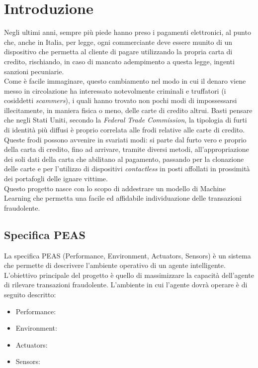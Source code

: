 \documentclass[]{article}
\begin{document}
\section{Introduzione}
    Negli ultimi anni, sempre più piede hanno preso i pagamenti elettronici, al punto che, anche in Italia, per legge, ogni commerciante deve essere munito di un dispositivo che permetta al cliente di pagare utilizzando la propria carta di credito, rischiando, in caso di mancato adempimento a questa legge, ingenti sanzioni pecuniarie.\\
    Come è facile immaginare, questo cambiamento nel modo in cui il denaro viene messo in circolazione ha interessato notevolmente criminali e truffatori (i cosiddetti \textit{scammers}), i quali hanno trovato non pochi modi di impossessarsi illecitamente, in maniera fisica o meno, delle carte di credito altrui.
    Basti pensare che negli Stati Uniti, secondo la \textit{Federal Trade Commission}, la tipologia di furti di identità più diffusi è proprio correlata alle frodi relative alle carte di credito.\\
    Queste frodi possono avvenire in svariati modi: si parte dal furto vero e proprio della carta di credito, fino ad arrivare, tramite diversi metodi, all'appropriazione dei soli dati della carta che abilitano al pagamento, passando per la clonazione delle carte e per l'utilizzo di dispositivi \textit{contactless} in posti affollati in prossimità dei portafogli delle ignare vittime.\\
    Questo progetto nasce con lo scopo di addestrare un modello di Machine Learning che permetta una facile ed affidabile individuazione delle transazioni fraudolente.

    \subsection{Specifica PEAS}
        La specifica PEAS (Performance, Environment, Actuators, Sensors) è un sistema che permette di descrivere l'ambiente operativo di un agente intelligente. L'obiettivo principale del progetto è quello di massimizzare la capacità dell'agente di rilevare transazioni fraudolente. L'ambiente in cui l'agente dovrà operare è di seguito descritto:
        \begin{itemize}
            \item Performance:
            \item Environment:
            \item Actuators:
            \item Sensors:
        \end{itemize}
\end{document}
